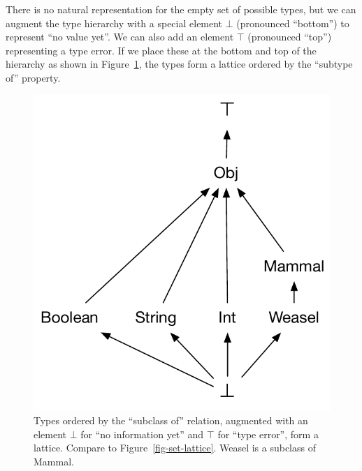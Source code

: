 \documentclass[11pt]{article}
\begin{document}
There is no natural representation for the empty set of possible
types, but we can augment the type hierarchy with a special element
$\bot$ (pronounced ``bottom'') to represent ``no value yet''.  We can
also add an element $\top$ (pronounced ``top'') representing a type
error.  If we place these at the bottom and top of the hierarchy as
shown in Figure~\ref{fig-type-lattice}, the types form a lattice ordered
by the ``subtype of'' property. 

\begin{figure}
\centerline{\includegraphics[scale=0.7]{img/Type-lattice.pdf}}
\caption{Types ordered by the ``subclass of'' relation, 
  augmented with an element $\bot$ for ``no information yet'' and
   $\top$ for ``type error'', form a lattice.  Compare to
   Figure~\ref{fig-set-lattice}. 
   Weasel is a subclass of Mammal.}
\label{fig-type-lattice}
\end{figure}
\end{document}
